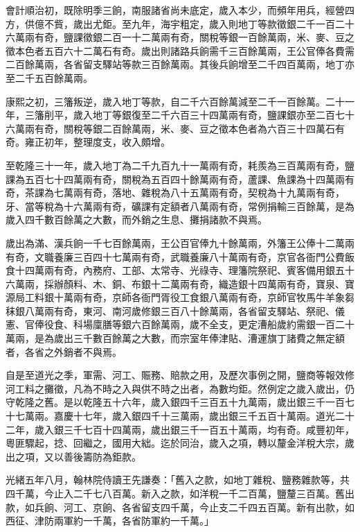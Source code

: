\begin{pinyinscope}
會計順治初，既除明季三餉，南服諸省尚未底定，歲入本少，而頻年用兵，經營四方，供億不貲，歲出尤鉅。至九年，海宇粗定，歲入則地丁等款徵銀二千一百二十六萬兩有奇，鹽課徵銀二百一十二萬兩有奇，關稅等銀一百餘萬兩，米、麥、豆之徵本色者五百六十二萬石有奇。歲出則諸路兵餉需千三百餘萬兩，王公官俸各費需二百餘萬兩，各省留支驛站等款三百餘萬兩。其後兵餉增至二千四百萬兩，地丁亦至二千五百餘萬兩。

康熙之初，三籓叛逆，歲入地丁等款，自二千六百餘萬減至二千一百餘萬。二十一年，三籓削平，歲入地丁等銀復至二千六百三十四萬兩有奇，鹽課銀亦至二百七十六萬兩有奇，關稅等銀二百餘萬兩，米、麥、豆之徵本色者為六百三十四萬石有奇。雍正初年，整理度支，收入頗增。

至乾隆三十一年，歲入地丁為二千九百九十一萬兩有奇，耗羨為三百萬兩有奇，鹽課為五百七十四萬兩有奇，關稅為五百四十餘萬兩有奇，蘆課、魚課為十四萬兩有奇，茶課為七萬兩有奇，落地、雜稅為八十五萬兩有奇，契稅為十九萬兩有奇，牙、當等稅為十六萬兩有奇，礦課有定額者八萬兩有奇，常例捐輸三百餘萬，是為歲入四千數百餘萬之大數，而外銷之生息、攤捐諸款不與焉。

歲出為滿、漢兵餉一千七百餘萬兩，王公百官俸九十餘萬兩，外籓王公俸十二萬兩有奇，文職養廉三百四十七萬兩有奇，武職養廉八十萬兩有奇，京官各衙門公費飯食十四萬兩有奇，內務府、工部、太常寺、光祿寺、理籓院祭祀、賓客備用銀五十六萬兩，採辦顏料、木、銅、布銀十二萬兩有奇，織造銀十四萬兩有奇，寶泉、寶源局工料銀十萬兩有奇，京師各衙門胥役工食銀八萬兩有奇，京師官牧馬牛羊象芻秣銀八萬兩有奇，東河、南河歲修銀三百八十餘萬兩，各省留支驛站、祭祀、儀憲、官俸役食、科場廩膳等銀六百餘萬兩，歲不全支，更定漕船歲約需銀一百二十萬兩，是為歲出三千數百餘萬之大數，而宗室年俸津貼、漕運旗丁諸費之無定額者，各省之外銷者不與焉。

自是至道光之季，軍需、河工、賑務、賠款之用，及歷次事例之開，鹽商等報效修河工料之攤徵，凡為不時之入與供不時之出者，為數均鉅。然例定之歲入歲出，仍守乾隆之舊。是以乾隆五十六年，歲入銀四千三百五十九萬兩，歲出銀三千一百七十七萬兩。嘉慶十七年，歲入銀四千十三萬兩，歲出銀三千五百十萬兩。道光二十二年，歲入銀三千七百十四萬兩，歲出銀三千一百五十萬兩，均有奇。咸豐初年，粵匪驟起，捻、回繼之，國用大絀。迄於同治，歲入之項，轉以釐金洋稅大宗，歲出之項，又以善後籌防為鉅款。

光緒五年八月，翰林院侍讀王先謙奏：「舊入之款，如地丁雜稅、鹽務雜款等，共四千萬，今止入二千七八百萬。新入之款，如洋稅一千二百萬，鹽釐三百萬。舊出款，如兵餉、河工、京餉、各省留支四千萬，今止支二千四五百萬。新有出款，如西征、津防兩軍約一千萬，各省防軍約一千萬。」


\end{pinyinscope}
